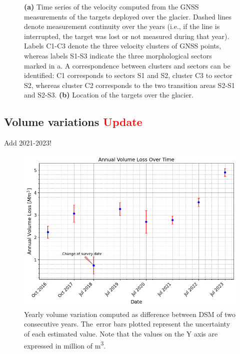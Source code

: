 \begin{figure}
    \caption{\textbf{(a)} Time series of the velocity computed from the GNSS measurements of the targets deployed over the glacier. Dashed lines denote measurement continuity over the years (i.e., if the line is interrupted, the target was lost or not measured during that year). Labels C1-C3 denote the three velocity clusters of GNSS points, whereas labels S1-S3 indicate the three morphological sectors marked in a. A correspondence between clusters and sectors can be identified: C1 corresponds to sectors S1 and S2, cluster C3 to sector S2, whereas cluster C2 corresponds to the two transition areas S2-S1 and S2-S3. \textbf{(b)} Location of the targets over the glacier.}
    \label{fig:3:GNSS_velocity}		
\end{figure}

\subsection{Volume variations \textcolor{red}{Update}}\label{sec:3:res:volumes}

{\color{red} Add 2021-2023!}

\begin{figure}
    \centering
    \includegraphics[width=0.8\columnwidth]{volume_loss_2015-2023.png}
    \caption{Yearly volume variation computed as difference between DSM of two
        consecutive years. The~error bars plotted represent the uncertainty of each
        estimated value. Note that the values on the Y axis are expressed in million of
        \si{\cubic\meter}.}
    \label{fig:3:volumes}
\end{figure}

